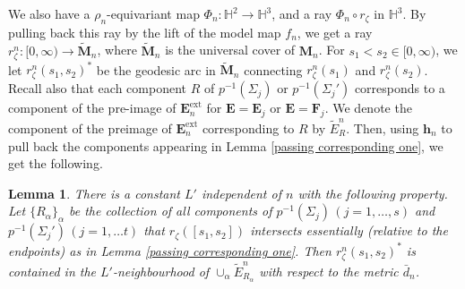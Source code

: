 \documentclass{amsart}
\newtheorem{lemma}[theorem]{Lemma}
\theoremstyle{definition}
\newcommand\HHH{{\mathbb H}}
\begin{document}
We also have a $\rho_n$-equivariant map $\Phi_n \colon \HHH^2 \rightarrow \HHH^3$, and  a ray $\Phi_n \circ r_\zeta$ in $\HHH^3$.
By pulling back this ray by the lift of the model map $f_n$, we get a ray $r^n_\zeta \colon [0,\infty) \rightarrow \widetilde{\mathbf M}_n$, where $\widetilde{\mathbf M}_n$ is the universal cover of $\mathbf M_n$.
For $s_1<s_2 \in [0,\infty)$, we let $r^n_\zeta(s_1,s_2)^*$ be the geodesic arc in $\widetilde{\mathbf M}_n$ connecting $r^n_\zeta(s_1)$ and $r^n_\zeta(s_2)$.
Recall also that each component $R$ of $p^{-1}(\Sigma_j)$ or $p^{-1}(\Sigma_j')$ corresponds to a component of the pre-image of $\mathbf E_n^\mathrm{ext}$ for $\mathbf E=\mathbf E_j$ or $\mathbf E=\mathbf F_j$.
We denote the component of the preimage of $\mathbf E_n^\mathrm{ext}$ corresponding to $R$ by $\widetilde E_R^n$.
Then, using  $\mathbf h_n$ to pull back the components appearing in  Lemma \ref{passing corresponding one}, we get the following.

\begin{lemma}
\label{uniformly farther}
There is a constant $L'$ independent of $n$ with the following property.
Let $\{R_\alpha\}_\alpha$ be the collection of all components of  $p^{-1}(\Sigma_j)\, (j=1, \dots , s)$ and $p^{-1}(\Sigma_j')\, (j=1, \dots t)$  that  $r_\zeta([s_1,s_2])$ intersects essentially (relative to the endpoints) as in Lemma \ref{passing corresponding one}.
Then $r^n_\zeta(s_1, s_2)^*$ is contained in the $L'$-neighbourhood of $\cup_\alpha \widetilde{E}^n_{R_\alpha}$ with respect to the metric $\bar d_n$.
\end{lemma}
\end{document}
